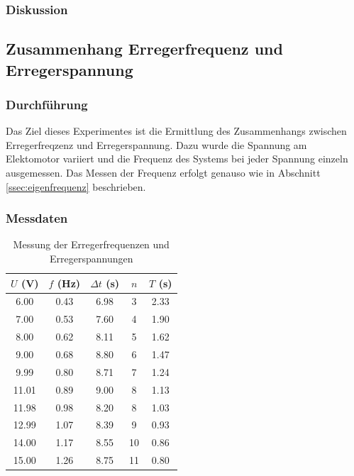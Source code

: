 \documentclass{article}
\begin{document}
\subsubsection{Diskussion}


\subsection{Zusammenhang Erregerfrequenz und Erregerspannung}
\subsubsection{Durchführung}
Das Ziel dieses Experimentes ist die Ermittlung des Zusammenhangs zwischen Erregerfreqzenz und Erregerspannung.
Dazu wurde die Spannung am Elektomotor variiert und die Frequenz des Systems bei jeder Spannung einzeln ausgemessen.
Das Messen der Frequenz erfolgt genauso wie in Abschnitt \ref{ssec:eigenfrequenz} beschrieben.

\subsubsection{Messdaten}
\begin{table}[H]
    \centering
    \begin{tabular}{|c|c|c|c|c|}
    \hline
    $U$ (V) & $f$ (Hz) & $\Delta t$ (s) & $n$ & $T$ (s) \\
    \hline
    6.00 & 0.43 & 6.98 & 3 & 2.33 \\
    7.00 & 0.53 & 7.60 & 4 & 1.90 \\
    8.00 & 0.62 & 8.11 & 5 & 1.62 \\
    9.00 & 0.68 & 8.80 & 6 & 1.47 \\
    9.99 & 0.80 & 8.71 & 7 & 1.24 \\
    11.01 & 0.89 & 9.00 & 8 & 1.13 \\
    11.98 & 0.98 & 8.20 & 8 & 1.03 \\
    12.99 & 1.07 & 8.39 & 9 & 0.93 \\
    14.00 & 1.17 & 8.55 & 10 & 0.86 \\
    15.00 & 1.26 & 8.75 & 11 & 0.80 \\
    \hline
    \end{tabular}
    \caption{Messung der Erregerfrequenzen und Erregerspannungen}
    \label{tab:messung_erregerfrequenz_spannung}
\end{table}
\end{document}
